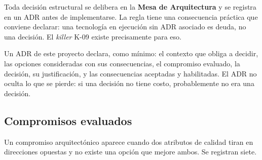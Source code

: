 \documentclass[11pt,a4paper]{article}
\begin{document}
Toda decisión estructural se delibera en la \textbf{Mesa de Arquitectura} y se registra en un ADR antes de implementarse. La regla tiene una consecuencia práctica que conviene declarar: una tecnología en ejecución sin ADR asociado es deuda, no una decisión. El \emph{killer} K-09 existe precisamente para eso.

Un ADR de este proyecto declara, como mínimo: el contexto que obliga a decidir, las opciones consideradas con sus consecuencias, el compromiso evaluado, la decisión, su justificación, y las consecuencias aceptadas y habilitadas. El ADR no oculta lo que se pierde: si una decisión no tiene costo, probablemente no era una decisión.

\subsection{Compromisos evaluados}

Un compromiso arquitectónico aparece cuando dos atributos de calidad tiran en direcciones opuestas y no existe una opción que mejore ambos. Se registran siete.
\end{document}
